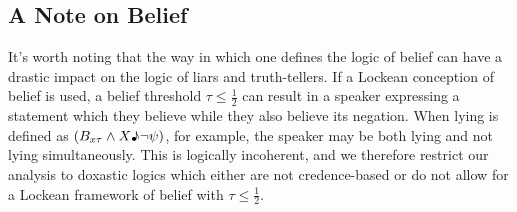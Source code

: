 \documentclass[12pt, titlepage, twoside, a4paper]{report}
\begin{document}
\subsection{A Note on Belief}
It’s worth noting that the way in which one defines the logic of belief can have a drastic impact on the logic of liars and truth-tellers. If a Lockean conception of belief is used, a belief threshold $\tau \leq \frac{1}{2}$ can result in a speaker expressing a statement which they believe while they also believe its negation. When lying is defined as $(B_{x\tau} \wedge X\text{\textmusicalnote} \neg \psi)$, for example, the speaker may be both lying and not lying simultaneously. This is logically incoherent, and we therefore restrict our analysis to doxastic logics which either are not credence-based or do not allow for a Lockean framework of belief with $\tau \leq \frac{1}{2}$. 
\end{document}

